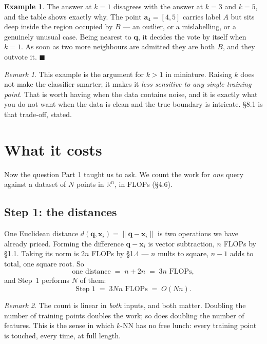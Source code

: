\documentclass[11pt]{article}
\theoremstyle{plain}
\theoremstyle{definition}
\newtheorem{ex}{Example}[section]
\theoremstyle{remark}
\newtheorem*{rmk}{Remark}
\newcommand{\R}{\mathbb{R}}
\newcommand{\vc}[1]{\mathbf{#1}}
\newcommand{\norm}[1]{\lVert #1\rVert}
\begin{document}
\begin{ex}
\noindent The answer at $k=1$ disagrees with the answer at $k=3$ and $k=5$, and
the table shows exactly why. The point $\vc{a}_4=[4,5]$ carries label $A$ but
sits deep inside the region occupied by $B$ --- an outlier, or a mislabelling,
or a genuinely unusual case. Being nearest to $\vc{q}$, it decides the vote by
itself when $k=1$. As soon as two more neighbours are admitted they are both
$B$, and they outvote it. \hfill$\blacksquare$
\end{ex}

\begin{rmk}
This example is the argument for $k>1$ in miniature. Raising $k$ does not make
the classifier smarter; it makes it \emph{less sensitive to any single training
point}. That is worth having when the data contains noise, and it is exactly
what you do not want when the data is clean and the true boundary is intricate.
\S8.1 is that trade-off, stated.
\end{rmk}

\section{What it costs}
Now the question Part 1 taught us to ask. We count the work for \emph{one}
query against a dataset of $N$ points in $\R^{n}$, in FLOPs (\S4.6).

\subsection{Step 1: the distances}
One Euclidean distance $d(\vc{q},\vc{x}_i)=\norm{\vc{q}-\vc{x}_i}$ is two
operations we have already priced. Forming the difference $\vc{q}-\vc{x}_i$ is
vector subtraction, $n$ FLOPs by \S1.1. Taking its norm is $2n$ FLOPs by \S1.4
--- $n$ mults to square, $n-1$ adds to total, one square root. So
\[
  \text{one distance} \;=\; n + 2n \;=\; 3n \text{ FLOPs} ,
\]
and Step~1 performs $N$ of them:
\[
  \boxed{\;\text{Step 1} \;=\; 3Nn \text{ FLOPs} \;=\; O(Nn) . \;}
\]

\begin{rmk}
The count is linear in \emph{both} inputs, and both matter. Doubling the number
of training points doubles the work; so does doubling the number of features.
This is the sense in which $k$-NN has no free lunch: every training point is
touched, every time, at full length.
\end{rmk}
\end{document}

